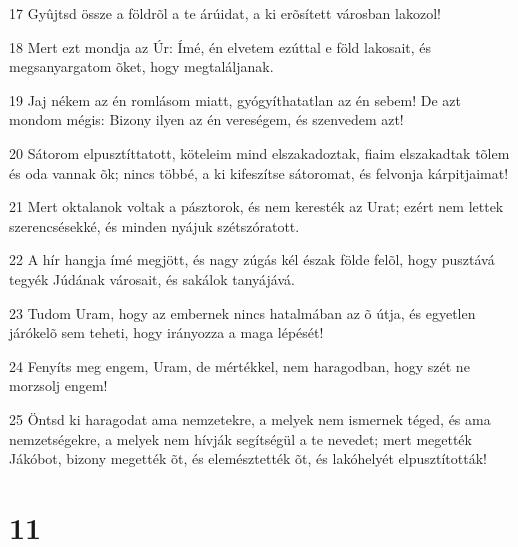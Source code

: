 \par 17 Gyûjtsd össze a földrõl a te árúidat, a ki erõsített városban lakozol!
\par 18 Mert ezt mondja az Úr: Ímé, én elvetem ezúttal e föld lakosait, és megsanyargatom õket, hogy megtaláljanak.
\par 19 Jaj nékem az én romlásom miatt, gyógyíthatatlan az én sebem! De azt mondom mégis: Bizony ilyen az én vereségem, és szenvedem azt!
\par 20 Sátorom elpusztíttatott, köteleim mind elszakadoztak, fiaim elszakadtak tõlem és oda vannak õk; nincs többé, a ki kifeszítse sátoromat, és felvonja kárpitjaimat!
\par 21 Mert oktalanok voltak a pásztorok, és nem keresték az Urat; ezért nem lettek szerencsésekké, és minden nyájuk szétszóratott.
\par 22 A hír hangja ímé megjött, és nagy zúgás kél észak földe felõl, hogy pusztává tegyék Júdának városait, és sakálok  tanyájává.
\par 23 Tudom Uram, hogy az embernek nincs hatalmában az õ útja, és egyetlen járókelõ sem teheti, hogy irányozza a maga lépését!
\par 24 Fenyíts meg engem, Uram, de mértékkel, nem haragodban, hogy szét ne morzsolj engem!
\par 25 Öntsd ki haragodat ama nemzetekre, a melyek nem ismernek téged, és ama nemzetségekre, a melyek nem hívják segítségül a te nevedet; mert megették Jákóbot, bizony megették õt, és elemésztették õt, és lakóhelyét elpusztították!

\chapter{11}

